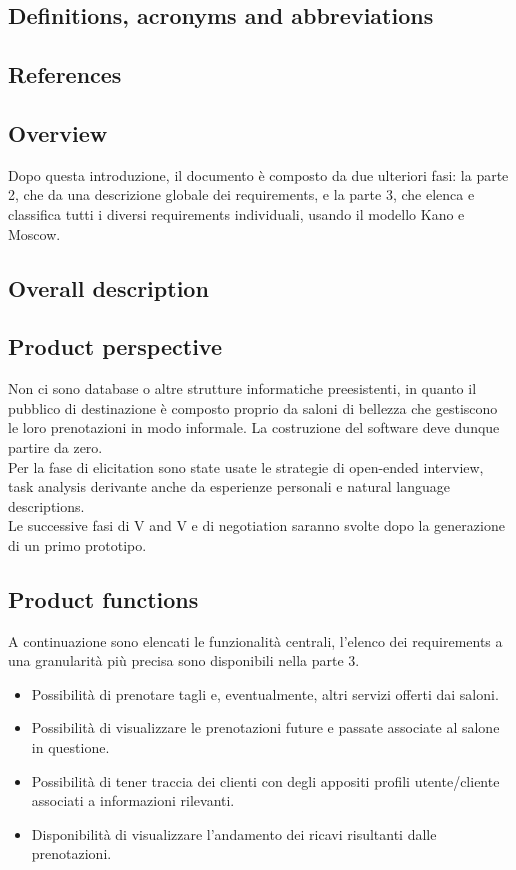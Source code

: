 \documentclass{article}
\begin{document}
\subsection {Definitions, acronyms and abbreviations }
\subsection {References} 
\subsection {Overview} 
Dopo questa introduzione, il documento è composto da due ulteriori fasi: la parte 2, che da una descrizione globale dei requirements, e la parte 3, che elenca e classifica tutti i diversi requirements individuali, usando il modello Kano e Moscow.
\subsection {Overall description} 
\subsection {Product perspective} 
Non ci sono database o altre strutture informatiche preesistenti, in quanto il pubblico di destinazione è composto proprio da saloni di bellezza che gestiscono le loro prenotazioni in modo informale. La costruzione del software deve dunque partire da zero.
\\ Per la fase di elicitation sono state usate le strategie di open-ended interview, task analysis derivante anche da esperienze personali e natural language descriptions. 
\\ Le successive fasi di V and V e di negotiation saranno svolte dopo la generazione di un primo prototipo.
\subsection {Product functions} 
A continuazione sono elencati le funzionalità centrali, l’elenco dei requirements a una granularità più precisa sono disponibili nella parte 3.
\begin{itemize}
    \item Possibilità di prenotare tagli e, eventualmente, altri servizi offerti dai saloni.
    \item Possibilità di visualizzare le prenotazioni future e passate associate al salone in questione.
    \item Possibilità di tener traccia dei clienti con degli appositi profili utente/cliente associati a informazioni rilevanti.
    \item Disponibilità di visualizzare l’andamento dei ricavi risultanti dalle prenotazioni. 
\end{itemize}
\end{document}
